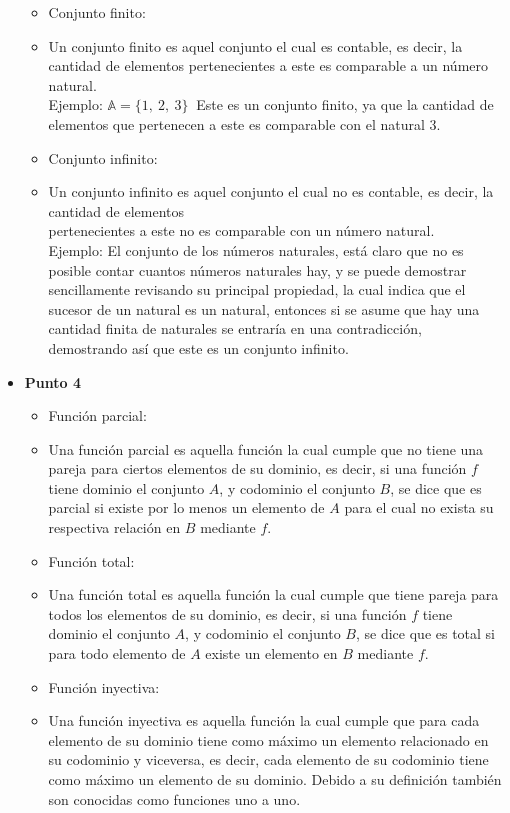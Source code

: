 \documentclass{article}
\begin{document}
\begin{itemize}
\begin{itemize}
			\item Conjunto finito:
			\item [] Un conjunto finito es aquel conjunto el cual es contable, es decir, la cantidad de elementos pertenecientes a este es comparable a un número natural.\\
			      Ejemplo:
			      $ \mathbb{A} = \{1,\ 2,\ 3\}\ $ Este es un conjunto finito, ya que la cantidad de elementos que pertenecen a este es comparable con el natural $3$.
			\item Conjunto infinito:
			\item [] Un conjunto infinito es aquel conjunto el cual no es contable, es decir, la cantidad de elementos \\pertenecientes a este no es comparable con un número natural.\\
			      Ejemplo: El conjunto de los números naturales, está claro que no es posible contar cuantos números naturales hay, y se puede demostrar sencillamente revisando su principal propiedad, la cual indica que el sucesor de un natural es un natural, entonces si se asume que hay una cantidad finita de naturales se entraría en una contradicción, demostrando así que este es un conjunto infinito.
		\end{itemize}
	\item[] \textbf{Punto 4}
		\begin{itemize}
			\item Función parcial:
			\item [] Una función parcial es aquella función la cual cumple que no tiene una pareja para ciertos elementos de su dominio, es decir, si una función $f$ tiene dominio el conjunto $A$, y codominio el conjunto $B$, se dice que es parcial si existe por lo menos un elemento de $A$ para el cual no exista su respectiva relación en $B$ mediante $f$.
			\item Función total:
			\item [] Una función total es aquella función la cual cumple que tiene pareja para todos los elementos de su dominio, es decir, si una función $f$ tiene dominio el conjunto $A$, y codominio el conjunto $B$, se dice que es total si para todo elemento de $A$ existe un elemento en $B$ mediante $f$.
			\item Función inyectiva:
			\item [] Una función inyectiva es aquella función la cual cumple que para cada elemento de su dominio tiene como máximo un elemento relacionado en su codominio y viceversa, es decir, cada elemento de su codominio tiene como máximo un elemento de su dominio. Debido a su definición también son conocidas como funciones uno a uno.

\end{itemize}
\end{itemize}
\end{document}
